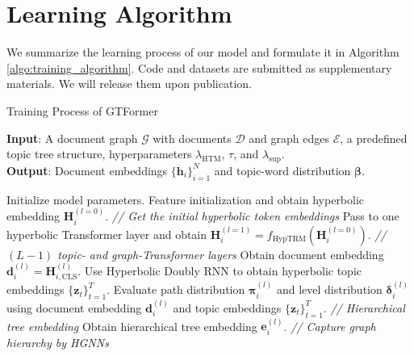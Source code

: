 \section{Learning Algorithm}
\label{sec:algorithm}

We summarize the learning process of our model and formulate it in Algorithm \ref{algo:training_algorithm}. Code and datasets are submitted as supplementary materials. We will release them upon publication.

\begin{algorithm}%
	\caption{Training Process of GTFormer}
	\label{algo:training_algorithm}
	\begin{flushleft}
		\hspace*{\algorithmicindent}\textbf{Input}: A document graph $ \mathcal{G} $ with documents $ \mathcal{D} $ and graph edges $ \mathcal{E} $, a predefined topic tree structure, hyperparameters $ \lambda_{\text{HTM}} $, $ \tau $, and $ \lambda_{\text{sup}} $. \\
		\hspace*{\algorithmicindent}\textbf{Output}: Document embeddings $ \{\textbf{h}_i\}_{i=1}^N $ and topic-word distribution $ \bm{\beta} $.
	\end{flushleft} 
	\begin{algorithmic}[1] %
		\State Initialize model parameters.
        \State Feature initialization %
        and obtain hyperbolic embedding $ \textbf{H}^{(l=0)}_i $.
        \Statex \quad\qquad\textit{ // Get the initial hyperbolic token embeddings}
        \State Pass to one hyperbolic Transformer layer and obtain $ \textbf{H}^{(l=1)}_i=f_{\text{HypTRM}}(\textbf{H}^{(l=0)}_i) $.
		\Statex \quad\qquad\textit{ // $ (L-1) $ topic- and graph-Transformer layers}
		\State Obtain document embedding $ \textbf{d}_i^{(l)}=\textbf{H}^{(l)}_{i,\text{CLS}} $. %
        \State Use Hyperbolic Doubly RNN to obtain hyperbolic topic embeddings $ \{\textbf{z}_t\}_{t=1}^T $.
        \State Evaluate path distribution $ \bm{\pi}_i^{(l)} $ and level distribution $ \bm{\delta}_i^{(l)} $ using document embedding $ \textbf{d}_i^{(l)} $ and topic embeddings $ \{\textbf{z}_t\}_{t=1}^T $.
        \Statex \qquad\qquad\textit{ // Hierarchical tree embedding}
        \State Obtain hierarchical tree embedding $ \textbf{e}_i^{(l)} $. %
        \Statex \qquad\qquad\textit{ // Capture graph hierarchy by HGNNs}

\end{algorithmic}
\end{algorithm}
